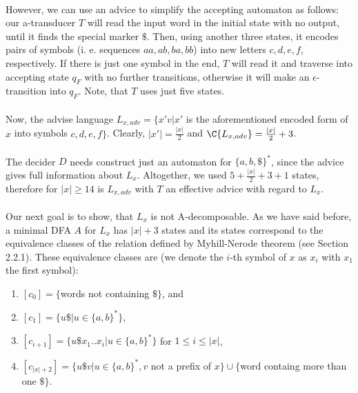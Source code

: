 \paragraph{}
However, we can use an advice to simplify the accepting automaton as follows: our a-transducer $T$ will read the input word in the initial state with no output, until it finds the special marker $\$ $. Then, using another three states, it encodes pairs of symbols (i. e. sequences $aa, ab, ba, bb$) into new letters $c, d, e, f$, respectively. If there is just one symbol in the end, $T$ will read it and traverse into accepting state $q_F$ with no further transitions, otherwise it will make an $\epsilon $-transition into $q_{F}$. Note, that $T$ uses just five states.

\paragraph{}
Now, the advise language $L_{x,adv} = \{ x'v | x'$ is the aforementioned encoded form of $x$ into symbols $c,d,e,f \}$. Clearly, $|x'| = \frac{|x|}{2}$ and $\C{L_{x,adv}} = \frac{|x|}{2}+3$.

\paragraph{}
The decider $D$ needs construct just an automaton for $\{a,b,\$\}^*$, since the advice gives full information about $L_x$. Altogether, we used $5 + \frac{|x|}{2}+3+1$ states, therefore for $|x| \geq 14$ is $L_{x,adv}$ with $T$ an effective advice with regard to $L_x$.

\paragraph{}
Our next goal is to show, that $L_x$ is not A-decomposable. As we have said before, a minimal DFA $A$ for $L_x$ has $|x|+3$ states and its states correspond to the equivalence classes of the relation defined by Myhill-Nerode theorem (see Section 2.2.1). These equivalence classes are (we denote the $i$-th symbol of $x$ as $x_i$ with $x_1$ the first symbol):
\begin{enumerate}
\item $[c_0] = \{$words not containing $\$\}$, and
\item $[c_1] = \{ u\$ | u \in \{ a,b\}^* \}$,
\item $[c_{i+1}] = \{ u\$x_1..x_i | u \in \{ a,b\}^* \}$ for $1 \leq i \leq |x|$,
\item $[c_{|x|+2}] = \{ u\$v | u \in \{ a,b\}^*, v $ not a prefix of $x \} \cup \{ $word containg more than one $\$\}$.
\end{enumerate}

